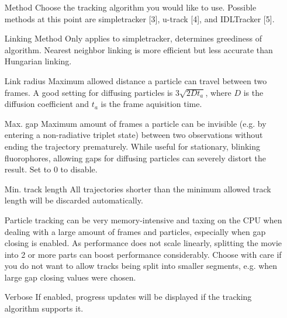 \documentclass[11pt,onside]{report}
\makeatletter
\numberwithin{equation}{chapter}
\gdef\tshortstack{\@ifnextchar[\@tshortstack{\@tshortstack[c]}}
\gdef\@tshortstack[#1]{%
  \leavevmode
  \vtop\bgroup
    \baselineskip-\p@\lineskip 3\p@
    \let\mb@l\hss\let\mb@r\hss
    \expandafter\let\csname mb@#1\endcsname\relax
    \let\\\@stackcr
    \@ishortstack}
\makeatother
\begin{document}
\begin{itemize}[leftmargin=2cm]
\item[Method] Choose the tracking algorithm you would like to use. Possible methods at this point are \textsf{simpletracker} [3], \textsf{u-track} [4], and \textsf{IDLTracker} [5].
\item [Linking Method] Only applies to simpletracker, determines greediness of algorithm. Nearest neighbor linking is more efficient but less accurate than Hungarian linking.
\item [Link radius] Maximum allowed distance a particle can travel between two frames. A good setting for diffusing particles is $3\sqrt{2 D t_a}$, where $D$ is the diffusion coefficient and $t_a$ is the frame aquisition time.
\item [Max. gap] Maximum amount of frames a particle can be invisible (e.g. by entering a non-radiative triplet state) between two observations without ending the trajectory prematurely. While useful for stationary, blinking fluorophores, allowing gaps for diffusing particles can severely distort the result. Set to 0 to disable.
\item [Min. track length] All trajectories shorter than the minimum allowed track length will be discarded automatically. 
\item [\smash{\tshortstack[1]{Split movie\\into parts}}] Particle tracking can be very memory-intensive and taxing on the CPU when dealing with a large amount of frames and particles, especially when gap closing is enabled. As performance does not scale linearly, splitting the movie into 2 or more parts can boost performance considerably. Choose with care if you do not want to allow tracks being split into smaller segments, e.g. when large gap closing values were chosen.
\item [Verbose] If enabled, progress updates will be displayed if the tracking algorithm supports it.
\end{itemize}
\clearpage
\end{document}
